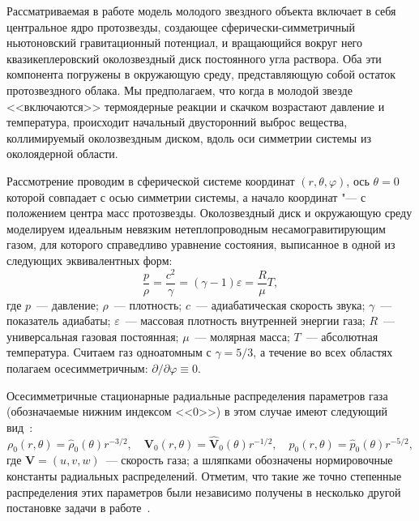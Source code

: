 Рассматриваемая в работе модель молодого звездного объекта включает
в себя центральное ядро протозвезды, создающее
сферически-симметричный ньютоновский гравитационный
потенциал, и вращающийся вокруг него квазикеплеровский околозвездный
диск постоянного угла раствора. Оба эти компонента погружены в
окружающую среду, представляющую собой остаток протозвездного облака.
Мы предполагаем, что когда в молодой звезде <<включаются>> термоядерные
реакции и скачком возрастают давление и температура, происходит начальный
двусторонний выброс вещества, коллимируемый околозвездным диском,
вдоль оси симметрии системы из околоядерной области.

Рассмотрение проводим в сферической системе координат
${(r, \theta, \varphi)}$, ось ${\theta = 0}$ которой совпадает
с осью симметрии системы, а начало координат "--- с положением центра
масс протозвезды.
Околозвездный диск и окружающую среду моделируем идеальным невязким
нетеплопроводным несамогравитирующим газом, для которого
справедливо уравнение состояния, выписанное в одной из следующих
эквивалентных форм:
\begin{equation}
\frac{p}{\rho} = \frac{c^2}{\gamma} = (\gamma - 1)\varepsilon
= \frac{R}{\mu}T,
\label{eq:kmx:EOS}
\end{equation}
где $p$~--- давление; $\rho$~--- плотность; $c$~--- адиабатическая
скорость звука; $\gamma$~--- показатель адиабаты;
$\varepsilon$~--- массовая плотность внутренней энергии газа;
$R$~--- универсальная газовая постоянная; $\mu$~--- молярная масса;
$T$~--- абсолютная температура. Считаем газ
одноатомным с ${\gamma = 5/3}$, а течение во всех областях полагаем
осесимметричным: ${\partial/\partial\varphi \equiv 0}$.

Осесимметричные стационарные радиальные распределения параметров
газа (обозначаемые нижним индексом <<$0$>>) в этом случае имеют
следующий вид~\cite{kmx:levin-etal-1999}:
\begin{equation}
\rho_0(r, \theta) = \hat\rho_0(\theta) r^{-3/2},\quad
\mathbf{V}_0(r, \theta) = \hat{\mathbf{V}}_0(\theta) r^{-1/2},\quad
p_0(r, \theta) = \hat p_0(\theta) r^{-5/2},
\label{eq:kmx:r-distribution}
\end{equation}
где ${\mathbf{V} = (u, v, w)}$~--- скорость газа; а шляпками
обозначены нормировочные константы радиальных распределений.
Отметим, что такие же точно степенные распределения этих
параметров были независимо получены в несколько другой постановке
задачи в работе~\cite{kmx:ouyed-etal-1997}.

